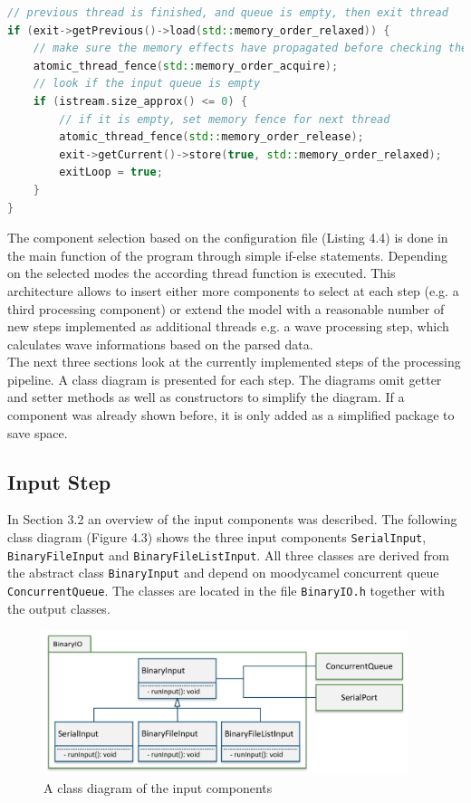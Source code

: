 \begin{lstlisting}[language=C++, caption=Code snippet highlighting the memory barriers.]
// previous thread is finished, and queue is empty, then exit thread
if (exit->getPrevious()->load(std::memory_order_relaxed)) {
    // make sure the memory effects have propagated before checking the size
    atomic_thread_fence(std::memory_order_acquire);
    // look if the input queue is empty
    if (istream.size_approx() <= 0) {
        // if it is empty, set memory fence for next thread
        atomic_thread_fence(std::memory_order_release);
        exit->getCurrent()->store(true, std::memory_order_relaxed);
        exitLoop = true;
    }
}
\end{lstlisting}

The component selection based on the configuration file (Listing 4.4) is done in the main function of the program through simple if-else statements. Depending on the selected modes the according thread function is executed. This architecture allows to insert either more components to select at each step (e.g. a third processing component) or extend the model with a reasonable number of new steps implemented as additional threads e.g. a wave processing step, which calculates wave informations based on the parsed data. \\

The next three sections look at the currently implemented steps of the processing pipeline. A class diagram is presented for each step. The diagrams omit getter and setter methods as well as constructors to simplify the diagram. If a component was already shown before, it is only added as a simplified package to save space.
\subsection{Input Step}
In Section 3.2 an overview of the input components was described. The following class diagram (Figure 4.3) shows the three input components \texttt{SerialInput}, \texttt{BinaryFileInput} and \texttt{BinaryFileListInput}. All three classes are derived from the abstract class \texttt{BinaryInput} and depend on moodycamel concurrent queue \texttt{ConcurrentQueue}. The classes are located in the file \texttt{BinaryIO.h} together with the output classes.

\begin{figure}[h]
\centering
      \includegraphics[width=0.95\textwidth]{input}
        \caption{A class diagram of the input components}
\end{figure}

